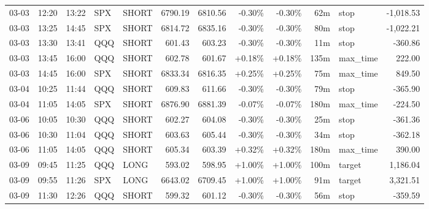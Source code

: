 \documentclass[11pt,a4paper,twoside]{article}
\begin{document}
\begin{center}
\begin{longtable}{>{\color{txtmain}}l l l l l r r r r r >{\color{txtmain}}l r}
03-03 & 12:20 & 13:22 & SPX & SHORT & 6790.19 & 6810.56 & \textcolor{lossred}{-0.30\%} & \textcolor{lossred}{-0.30\%} & 62m & stop & \textcolor{lossred}{-1,018.53} \\
03-03 & 13:25 & 14:45 & SPX & SHORT & 6814.72 & 6835.16 & \textcolor{lossred}{-0.30\%} & \textcolor{lossred}{-0.30\%} & 80m & stop & \textcolor{lossred}{-1,022.21} \\
03-03 & 13:30 & 13:41 & QQQ & SHORT & 601.43 & 603.23 & \textcolor{lossred}{-0.30\%} & \textcolor{lossred}{-0.30\%} & 11m & stop & \textcolor{lossred}{-360.86} \\
03-03 & 13:45 & 16:00 & QQQ & SHORT & 602.78 & 601.67 & \textcolor{wingreen}{+0.18\%} & \textcolor{wingreen}{+0.18\%} & 135m & max\_time & \textcolor{wingreen}{222.00} \\
03-03 & 14:45 & 16:00 & SPX & SHORT & 6833.34 & 6816.35 & \textcolor{wingreen}{+0.25\%} & \textcolor{wingreen}{+0.25\%} & 75m & max\_time & \textcolor{wingreen}{849.50} \\
03-04 & 10:25 & 11:44 & QQQ & SHORT & 609.83 & 611.66 & \textcolor{lossred}{-0.30\%} & \textcolor{lossred}{-0.30\%} & 79m & stop & \textcolor{lossred}{-365.90} \\
03-04 & 11:05 & 14:05 & SPX & SHORT & 6876.90 & 6881.39 & \textcolor{lossred}{-0.07\%} & \textcolor{lossred}{-0.07\%} & 180m & max\_time & \textcolor{lossred}{-224.50} \\
03-06 & 10:05 & 10:30 & QQQ & SHORT & 602.27 & 604.08 & \textcolor{lossred}{-0.30\%} & \textcolor{lossred}{-0.30\%} & 25m & stop & \textcolor{lossred}{-361.36} \\
03-06 & 10:30 & 11:04 & QQQ & SHORT & 603.63 & 605.44 & \textcolor{lossred}{-0.30\%} & \textcolor{lossred}{-0.30\%} & 34m & stop & \textcolor{lossred}{-362.18} \\
03-06 & 11:05 & 14:05 & QQQ & SHORT & 605.34 & 603.39 & \textcolor{wingreen}{+0.32\%} & \textcolor{wingreen}{+0.32\%} & 180m & max\_time & \textcolor{wingreen}{390.00} \\
03-09 & 09:45 & 11:25 & QQQ & LONG & 593.02 & 598.95 & \textcolor{wingreen}{+1.00\%} & \textcolor{wingreen}{+1.00\%} & 100m & target & \textcolor{wingreen}{1,186.04} \\
03-09 & 09:55 & 11:26 & SPX & LONG & 6643.02 & 6709.45 & \textcolor{wingreen}{+1.00\%} & \textcolor{wingreen}{+1.00\%} & 91m & target & \textcolor{wingreen}{3,321.51} \\
03-09 & 11:30 & 12:26 & QQQ & SHORT & 599.32 & 601.12 & \textcolor{lossred}{-0.30\%} & \textcolor{lossred}{-0.30\%} & 56m & stop & \textcolor{lossred}{-359.59} \\

\end{longtable}
\end{center}
\end{document}
